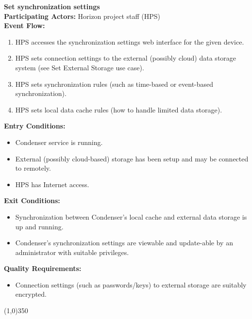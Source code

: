 		\textbf{Set synchronization settings}\\ 
		\textbf{Participating Actors:} Horizon project staff (HPS) \\
		\textbf{Event Flow:}
		\begin{enumerate}
\item HPS accesses the synchronization settings web interface for the given device.
\item HPS sets connection settings to the external (possibly cloud) data storage system (see Set External Storage use case).
\item HPS sets synchronization rules (such as time-based or event-based synchronization). 
\item HPS sets local data cache rules (how to handle limited data storage).
	    \end{enumerate}
		\textbf{Entry Conditions:}
		\begin{itemize}
\item Condenser service is running.
\item External (possibly cloud-based) storage has been setup and may be connected to remotely.
\item HPS has Internet access.
		\end{itemize}		 
		\textbf{Exit Conditions:}
		\begin{itemize}
\item Synchronization between Condenser's local cache and external data storage is up and running.
\item Condenser's synchronization settings are viewable and update-able by an administrator with suitable privileges.
		\end{itemize}			
		\textbf{Quality Requirements:}
		\begin{itemize}
\item Connection settings (such as passwords/keys) to external storage are suitably encrypted.
		\end{itemize}		
		\line(1,0){350}		

